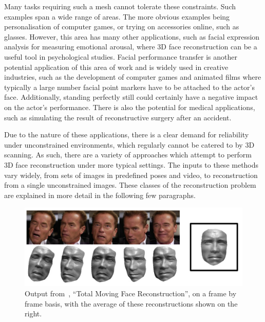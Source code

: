 Many tasks requiring such a mesh cannot tolerate these
constraints. Such examples span a wide range of areas. The more
obvious examples being personalisation of computer games, or trying on
accessories online, such as glasses. However, this area has many other
applications, such as facial expression analysis for measuring
emotional arousal, where 3D face reconstruction can be a useful tool
in psychological studies. Facial performance transfer is another
potential application of this area of work and is widely used in
creative industries, such as the development of computer games and
animated films where typically a large number facial point markers
have to be attached to the actor's face. Additionally, standing
perfectly still could certainly have a negative impact on the actor's
performance. There is also the potential for medical applications,
such as simulating the result of reconstructive surgery after an
accident.

Due to the nature of these applications, there is a clear demand for
reliability under unconstrained environments, which regularly cannot
be catered to by 3D scanning. As such, there are a variety of
approaches which attempt to perform 3D face reconstruction under more
typical settings. The inputs to these methods vary widely, from sets
of images in predefined poses and video, to reconstruction from a
single unconstrained images. These classes of the reconstruction
problem are explained in more detail in the following few paragraphs.

\begin{figure}
  \centering
  \includegraphics[width=\linewidth]{img/total_moving.png}
  \caption[Example output from Total Moving Face Reconstruction
  method]{Output from~\cite{suwajanakorn2014total}, ``Total Moving
    Face Reconstruction'', on a frame by frame basis, with the average
    of these reconstructions shown on the right.}
  \label{fig:total_moving}
\end{figure}

